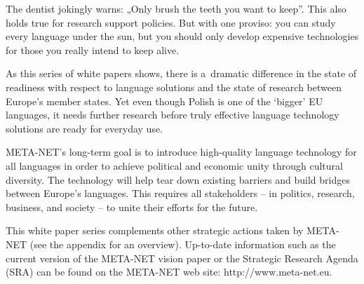 \begin{multicols}{2}

The dentist jokingly warns: „Only brush the teeth you want to
keep”. This also holds true for research support policies. But with
one proviso: you can study every language under the sun, but you
should only develop expensive technologies for those you really intend
to keep alive. 

As this series of white papers shows, there is a~dramatic difference
in the state of readiness with respect to language solutions and the
state of research between Europe’s member states. Yet even though
Polish is one of the ‘bigger’ EU languages, it needs further
research before truly effective language technology solutions are
ready for everyday use. 

META-NET’s long-term goal is to introduce high-quality language
technology for all languages in order to achieve political and
economic unity through cultural diversity. The technology will help
tear down existing barriers and build bridges between Europe’s
languages. This requires all stakeholders -- in politics, research,
business, and society -- to unite their efforts for the future. 

This white paper series complements other strategic actions taken by
META-NET (see the appendix for an overview). Up-to-date information
such as the current version of the META-NET vision paper \cite{Meta1}
or the Strategic Research Agenda (SRA) can be found on the META-NET
web site: http://www.meta-net.eu. 

\end{multicols} \clearpage 


